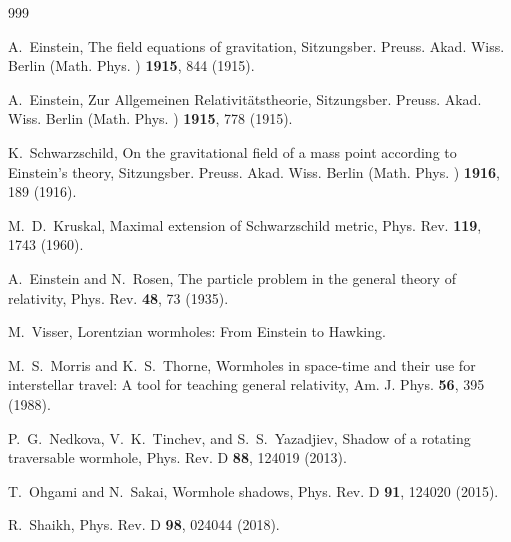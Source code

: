 \documentclass[aps,preprint,groupedaddress,nofootinbib,superscriptaddress,showkeys,showpacs,eqsecnum,amsmath,amssymb]{revtex4-1}
\begin{document}
\begin{thebibliography}{999}

A.~Einstein, The field equations of gravitation,
Sitzungsber. Preuss. Akad. Wiss. Berlin (Math. Phys. ) \textbf{1915}, 844 (1915).

A.~Einstein, Zur Allgemeinen Relativit\"atstheorie, Sitzungsber. Preuss. Akad. Wiss. Berlin (Math. Phys. ) \textbf{1915}, 778 (1915).

K.~Schwarzschild, On the gravitational field of a mass point according to Einstein's theory, Sitzungsber. Preuss. Akad. Wiss. Berlin (Math. Phys. ) \textbf{1916}, 189 (1916).

M.~D.~Kruskal, Maximal extension of Schwarzschild metric,
Phys. Rev. \textbf{119}, 1743 (1960).

A.~Einstein and N.~Rosen, The particle problem in the general theory of relativity,
Phys. Rev. \textbf{48}, 73 (1935).

M.~Visser, Lorentzian wormholes: From Einstein to Hawking.

M.~S.~Morris and K.~S.~Thorne, Wormholes in space-time and their use for interstellar travel: A tool for teaching general relativity,
Am. J. Phys. \textbf{56}, 395 (1988).

P.~G.~Nedkova, V.~K.~Tinchev, and S.~S.~Yazadjiev, Shadow of a rotating traversable wormhole,
Phys. Rev. D \textbf{88}, 124019 (2013).

T.~Ohgami and N.~Sakai,
Wormhole shadows,
Phys. Rev. D \textbf{91}, 124020 (2015).

R.~Shaikh,
Phys. Rev. D \textbf{98}, 024044 (2018).


\end{thebibliography}
\end{document}
